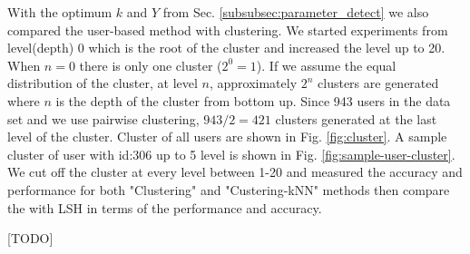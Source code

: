 \documentclass[conference]{IEEEtran}
\begin{document}
With the optimum $k$ and $Y$ from Sec. \ref{subsubsec:parameter_detect} we also
compared the user-based method with clustering. We started experiments from
level(depth) 0 which is the root of the cluster and increased the level up to 
20. When $n=0$ there is only one cluster ($2^0 = 1$). If we assume the equal
distribution of the cluster, at level $n$, approximately $2^n$ clusters are 
generated where $n$ is the depth of the cluster from bottom up. Since 943 users 
in the data set and we use pairwise clustering, $943/2 = 421$ clusters generated 
at the last level of the cluster. Cluster of all users are shown in Fig. \ref{fig:cluster}. 
A sample cluster of user with id:306 up to 5 level is shown in Fig. \ref{fig:sample-user-cluster}.
We cut off the cluster at every level between 1-20 and measured the accuracy 
and performance for both "Clustering" and "Custering-kNN" methods then compare 
the with LSH in terms of the performance and accuracy.

[TODO]
\end{document}
